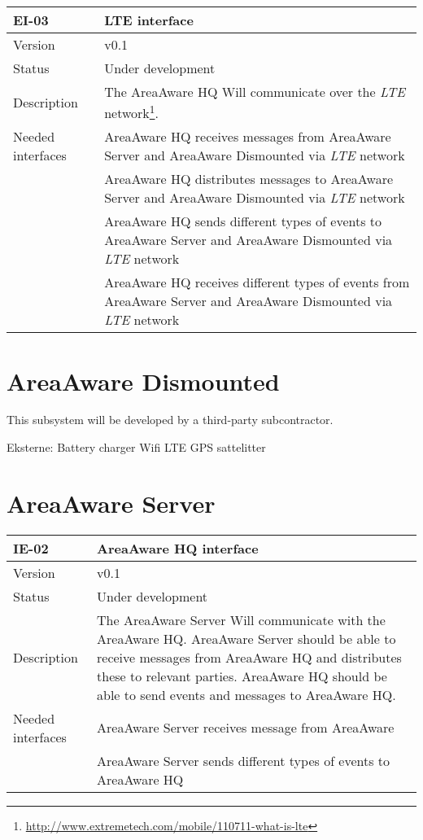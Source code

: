 \begin{longtable}{| p{3.5cm} |  p{10cm} | }
	\hline
	\textbf{EI-03} &  \textbf{LTE interface} \\
	\hline
	Version & v0.1 \\
	\hline
	Status & Under development \\
	\hline
	Description & The AreaAware HQ Will communicate over the \emph{LTE} network\footnote{\url{http://www.extremetech.com/mobile/110711-what-is-lte}}.
	\\
	\hline
	Needed interfaces 
	& AreaAware HQ receives messages from AreaAware Server and AreaAware Dismounted via \emph{LTE} network \\
	& AreaAware HQ distributes messages to AreaAware Server and AreaAware Dismounted via \emph{LTE} network \\ 
	& AreaAware HQ sends different types of events to AreaAware Server and AreaAware Dismounted via \emph{LTE} network \\
	& AreaAware HQ receives different types of events from AreaAware Server and AreaAware Dismounted via \emph{LTE} network \\
	\hline
\end{longtable}

\section{AreaAware Dismounted}
This subsystem will be developed by a third-party subcontractor.


Eksterne:
Battery charger
Wifi
LTE
GPS sattelitter


\section{AreaAware Server}
\begin{longtable}{| p{3.5cm} |  p{10cm} | }
	\hline
	\textbf{IE-02} &  \textbf{AreaAware HQ interface } \\
	\hline
	Version & v0.1 \\
	\hline
	Status & Under development \\
	\hline
	Description & The AreaAware Server Will communicate with the AreaAware HQ. AreaAware Server should be able to receive messages from AreaAware HQ and distributes these to relevant parties.  AreaAware HQ should be able to send events and messages to AreaAware HQ.
	\\
	\hline
	Needed interfaces & AreaAware Server receives message from AreaAware \\
	& AreaAware Server sends different types of events to AreaAware HQ \\
	\hline
\end{longtable}

